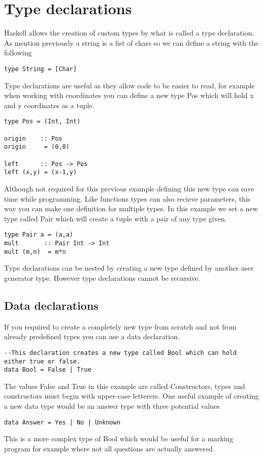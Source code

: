 \documentclass[12pt, oneside]{article}
\begin{document}
\section{Type declarations}
Haskell allows the creation of custom types by what is called a type declaration. As mention previously a string is a list of chars so we can define a string with the following

\begin{lstlisting}
type String = [Char]
\end{lstlisting}
Type declarations are useful as they allow code to be easier to read, for example when working with coordinates you can define a new type Pos which will hold x and y coordinates as a tuple.
\begin{lstlisting}
type Pos = (Int, Int)

origin    :: Pos
origin     = (0,0)

left      :: Pos -> Pos
left (x,y) = (x-1,y)
\end{lstlisting}
Although not required for this previous example defining this new type can save time while programming.
Like functions types can also recieve parameters, this way you can make one definition for multiple types. In this example we set a new type called Pair which will create a tuple with a pair of any type given.
\begin{lstlisting}
type Pair a = (a,a)
mult       :: Pair Int -> Int
mult (m,n)  = m*n
\end{lstlisting}
Type declarations can be nested by creating a new type defined by another user generator type. However type declarations cannot be recursive.

\subsection{Data declarations}
If you required to create a completely new type from scratch and not from already predefined types you can use a data declaration.
\begin{lstlisting}
--This declaration creates a new type called Bool which can hold either true or false.
data Bool = False | True
\end{lstlisting}
The values False and True in this example are called Constructors, types and constructors must begin with upper-case letterers.
One useful example of creating a new data type would be an answer type with three potential values
\begin{lstlisting}
data Answer = Yes | No | Unknown
\end{lstlisting}
This is a more complex type of Bool which would be useful for a marking program for example where not all questions are actually answered.
\end{document}
